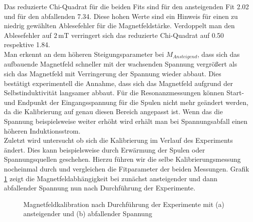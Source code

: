 \documentclass{scrartcl}
\begin{document}
Das reduzierte Chi-Quadrat für die beiden Fits sind für den ansteigenden Fit 2.02 und für den abfallenden 7.34. Diese hohen Werte sind ein Hinweis für einen zu niedrig gewählten Ablesefehler für die Magnetfeldstärke. Verdoppelt man den Ablesefehler auf $2 \, \mathrm{mT}$ verringert sich das reduzierte Chi-Quadrat auf 0.50 respektive 1.84. \\
Man erkennt an dem höheren Steigungsparameter bei $M_{Ansteigend}$, dass sich das aufbauende Magnetfeld schneller mit der wachsenden Spannung vergrößert als sich das Magnetfeld mit Verringerung der Spannung wieder abbaut. Dies bestätigt experimentell die Annahme, dass sich das Magnetfeld aufgrund der Selbstinduktivität langsamer abbaut. 
Für die Resonanzmessungen können Start- und Endpunkt der Eingangsspannung für die Spulen nicht mehr geändert werden, da die Kalibrierung auf genau diesen Bereich angepasst ist. Wenn das die Spannung beispielsweise weiter erhöht wird erhält man bei Spannungsabfall einen höheren Induktionsstrom. \\
Zuletzt wird untersucht ob sich die Kalibrierung im Verlauf des Experiments ändert. Dies kann beispielsweise durch Erwärmung der Spulen oder Spannungsquellen geschehen. Hierzu führen wir die selbe Kalibrierungsmessung nocheinmal durch und vergleichen die Fitparameter der beiden Messungen. 
Grafik \ref*{fig:Magnetfeldkalibration} zeigt die Magnetfeldabhängigkeit bei zunächst ansteigender und dann abfallender Spannung nun nach Durchführung der Experimente.
\begin{figure}[h!]
    \centering
    \caption{Magnetfeldkalibration nach Durchführung der Experimente mit (a) ansteigender und (b) abfallender Spannung}
    \label{fig:Magnetfeldkalibration}
\end{figure}
\end{document}
